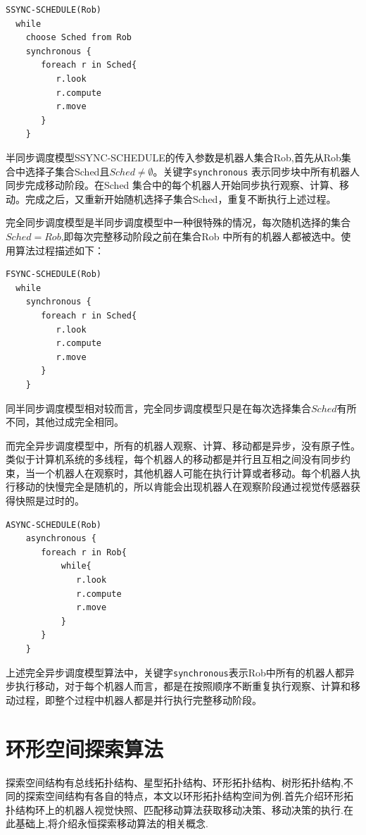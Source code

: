 \begin{lstlisting}
SSYNC-SCHEDULE(Rob)
  while
    choose Sched from Rob
    synchronous {
       foreach r in Sched{
          r.look
          r.compute
          r.move
       }
    }
\end{lstlisting}

半同步调度模型SSYNC-SCHEDULE的传入参数是机器人集合Rob,首先从Rob集合中选择子集合Sched且$Sched \neq \emptyset$。关键字\verb|synchronous| 表示同步块中所有机器人同步完成移动阶段。在Sched 集合中的每个机器人开始同步执行观察、计算、移动。完成之后，又重新开始随机选择子集合Sched，重复不断执行上述过程。

完全同步调度模型是半同步调度模型中一种很特殊的情况，每次随机选择的集合$Sched = Rob $,即每次完整移动阶段之前在集合Rob 中所有的机器人都被选中。使用算法过程描述如下：

\begin{lstlisting}
FSYNC-SCHEDULE(Rob)
  while
    synchronous {
       foreach r in Sched{
          r.look
          r.compute
          r.move
       }
    }
\end{lstlisting}

同半同步调度模型相对较而言，完全同步调度模型只是在每次选择集合$Sched$有所不同，其他过成完全相同。

而完全异步调度模型中，所有的机器人观察、计算、移动都是异步，没有原子性。类似于计算机系统的多线程，每个机器人的移动都是并行且互相之间没有同步约束，当一个机器人在观察时，其他机器人可能在执行计算或者移动。每个机器人执行移动的快慢完全是随机的，所以肯能会出现机器人在观察阶段通过视觉传感器获得快照是过时的。

\begin{lstlisting}
ASYNC-SCHEDULE(Rob)
    asynchronous {
       foreach r in Rob{
           while{
              r.look
              r.compute
              r.move
           }
       }
    }
\end{lstlisting}

上述完全异步调度模型算法中，关键字\verb|synchronous|表示Rob中所有的机器人都异步执行移动，对于每个机器人而言，都是在按照顺序不断重复执行观察、计算和移动过程，即整个过程中机器人都是并行执行完整移动阶段。

\section{环形空间探索算法}
探索空间结构有总线拓扑结构、星型拓扑结构、环形拓扑结构、树形拓扑结构,不同的探索空间结构有各自的特点，本文以环形拓扑结构空间为例.首先介绍环形拓扑结构环上的机器人视觉快照、匹配移动算法获取移动决策、移动决策的执行.在此基础上,将介绍永恒探索移动算法的相关概念.

